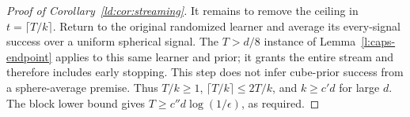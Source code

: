 \begin{proof}[Proof of Corollary~\ref{ld:cor:streaming}]
It remains to remove the ceiling in \(t=\lceil T/k\rceil\).
Return to the original randomized learner and average its every-signal
success over a uniform spherical signal. The \(T>d/8\) instance of
Lemma~\ref{l:caps-endpoint} applies to this same learner and prior; it
grants the entire stream and therefore includes early stopping. This
step does not infer cube-prior success from a sphere-average premise.
Thus \(T/k\ge1\), \(\lceil T/k\rceil\le2T/k\), and \(k\ge c'd\)
for large \(d\). The block lower bound gives
\(T\ge c''d\log(1/\epsilon)\), as required.
\end{proof}
